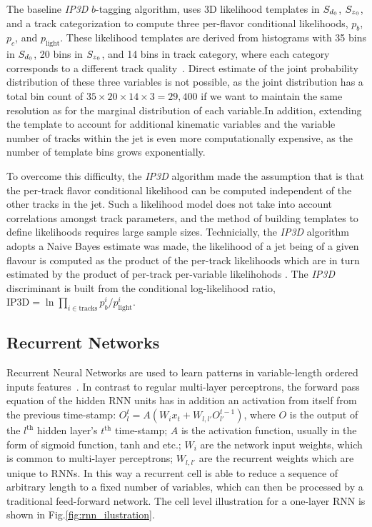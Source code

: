 The baseline \textit{IP3D} $b$-tagging algorithm, uses 3D likelihood templates in $S_{d{_0}}$, $S_{z{_0}}$, and a track categorization to compute three per-flavor conditional likelihoods, $p_b$, $p_c$, and $p_{\textrm{light}}$. These likelihood templates are derived from histograms with 35 bins in $S_{d{_0}}$, 20 bins in $S_{z{_0}}$, and 14 bins in track category, where each category corresponds to a different track quality~\cite{ATL-PHYS-PUB-2015-022}. Direct estimate of the joint probability distribution of these three variables is not possible, as the joint distribution has a total bin count of $35 \times 20 \times 14 \times 3 = 29,400$ if we want to maintain the same resolution as for the marginal distribution of each variable.In addition, extending the template to account for additional kinematic variables and the variable number of tracks within the jet is even more computationally expensive, as the number of template bins grows exponentially.

To overcome this difficulty, the \textit{IP3D} algorithm made the assumption that is that the per-track flavor conditional likelihood can be computed independent of the other tracks in the jet.  Such a likelihood model does not take into account correlations amongst track parameters, and the method of building templates to define likelihoods requires large sample sizes. Technicially, the \textit{IP3D} algorithm adopts a Naive Bayes estimate was made, the likelihood of a jet being of a given flavour is computed as the product of the per-track likelihoods which are in turn estimated by the product of per-track per-variable likelihohods . The \textit{IP3D} discriminant is built from the conditional log-likelihood ratio, $\textrm{IP3D}=\ln \prod_{i \in \textrm{tracks}} p_b^i / p_{\textrm{light}}^i$. 

\subsection{Recurrent Networks}

Recurrent Neural Networks are used to learn patterns in variable-length ordered inputs features~\cite{ref:RNNthesis, dlbook}. In contrast to regular multi-layer perceptrons, the forward pass equation of the hidden RNN units has in addition an activation from itself from the previous time-stamp: $O^t_l = A( W_i x_t + W_{l,l'} O^{t-1}_{l'})$, where $O$ is the output of the $l^{\text{th}}$ hidden layer's $t^{\text{th}}$ time-stamp; $A$ is the activation function, usually in the form of sigmoid function, tanh and etc.; $W_i$ are the network input weights, which is common to multi-layer perceptrons; $W_{l,l'}$ are the recurrent weights which are unique to RNNs. In this way a recurrent cell is able to reduce a sequence of arbitrary length to a fixed number of variables, which can then be processed by a traditional feed-forward network. The cell level illustration for a one-layer RNN is shown in Fig.\ref{fig:rnn_ilustration}.

